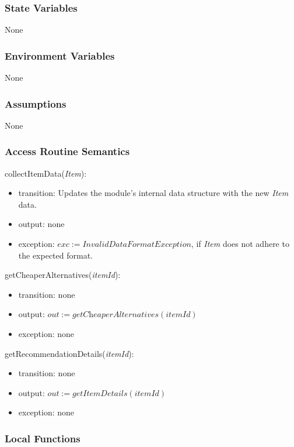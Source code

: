 \documentclass[12pt, titlepage]{article}
\begin{document}
\subsubsection{State Variables}

None

\subsubsection{Environment Variables}

None

\subsubsection{Assumptions}

None

\subsubsection{Access Routine Semantics}

\noindent collectItemData(\textit{Item}):
\begin{itemize}
  \item transition: Updates the module's internal data structure with the new \textit{Item} data.
  \item output: none
  \item exception: $exc := \textit{InvalidDataFormatException}$, if \textit{Item} does not adhere to the expected format.
\end{itemize}

\noindent getCheaperAlternatives(\textit{itemId}):
\begin{itemize}
  \item transition: none
  \item output: $out := \textit{getCheaperAlternatives}(\textit{itemId})$ 
  \item exception: none
\end{itemize}

\noindent getRecommendationDetails(\textit{itemId}):
\begin{itemize}
  \item transition: none
  \item output: $out := \textit{getItemDetails}(\textit{itemId})$
  \item exception: none
\end{itemize}

\subsubsection{Local Functions}
\end{document}
